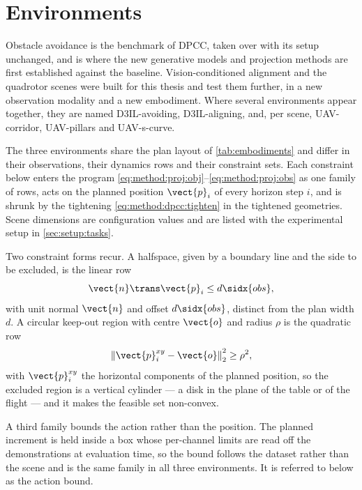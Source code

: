 \section{Environments}\label{sec:method:envs}

Obstacle avoidance is the
benchmark of \ac{DPCC}, taken over with its setup unchanged, and is where the new generative models
and projection methods are first established against the baseline. Vision-conditioned alignment and the
quadrotor scenes were built for this thesis and test them further, in a new observation modality and a
new embodiment. Where several environments appear together, they are named D3IL-avoiding,
D3IL-aligning, and, per scene, UAV-corridor, UAV-pillars and UAV-s-curve.

The three environments share the plan layout of \autoref{tab:embodiments} and differ in their
observations, their dynamics rows and their constraint sets. Each constraint below enters the program
\eqref{eq:method:proj:obj}--\eqref{eq:method:proj:obs} as one family of rows, acts on the planned
position $\vect{p}_{i}$ of every horizon step $i$, and is shrunk by the tightening
\eqref{eq:method:dpcc:tighten} in the tightened geometries. Scene dimensions are configuration values and
are listed with the experimental setup in \autoref{sec:setup:tasks}.

Two constraint forms recur. A halfspace, given by a boundary line and the side to be excluded, is the
linear row
\begin{equation}\label{eq:method:env:halfspace}
  \vect{n}\trans\vect{p}_{i} \le d\sidx{obs} ,
\end{equation}
with unit normal $\vect{n}$ and offset $d\sidx{obs}$, distinct from the plan width $d$. A circular keep-out region with centre $\vect{o}$ and radius
$\rho$ is the quadratic row
\begin{equation}\label{eq:method:env:disk}
  \left\|\vect{p}_{i}^{xy}-\vect{o}\right\|_{2}^{2} \ge \rho^{2},
\end{equation}
with $\vect{p}_{i}^{xy}$ the horizontal components of the planned position, so the excluded region is a vertical
cylinder --- a disk in the plane of the table or of the flight --- and it makes the feasible set non-convex.

A third family bounds the action rather than the position. The planned increment is held inside a
box whose per-channel limits are read off the demonstrations at evaluation time, so the bound
follows the dataset rather than the scene and is the same family in all three environments. It is
referred to below as the action bound.

